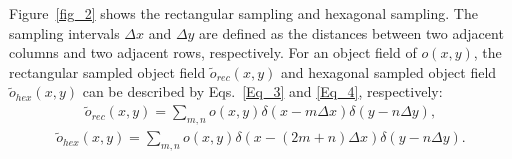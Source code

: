 \documentclass[10pt,letterpaper]{article}
\begin{document}
Figure~\ref{fig_2} shows the rectangular sampling and hexagonal sampling. The sampling intervals $\Delta x$ and $\Delta y$ are defined as the distances between two adjacent columns and two adjacent rows, respectively. For an object field of $o(x, y)$, the rectangular sampled object field $\tilde{o}_{rec}(x, y)$ and hexagonal sampled object field $\tilde{o}_{hex}(x, y)$ can be described by Eqs.~\eqref{Eq_3} and \eqref{Eq_4}, respectively:
\begin{align}
\tilde{o}_{rec} (x,y)=\sum _{m,n}o(x,y)\delta (x-m\Delta x)\delta (y-n\Delta y) , 
\label{Eq_3} 
\end{align} 
\begin{align}
\tilde{o}_{hex} (x,y)=\sum _{m,n}o(x,y)\delta \left(x-(2m+n)\Delta x\right) \delta (y-n\Delta y). 
\label{Eq_4} 
\end{align}
\end{document}

